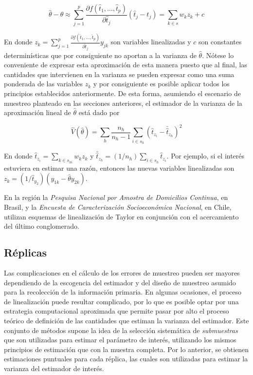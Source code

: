 \documentclass[12pt,spanish,]{book}
\begin{document}
\[
\hat{\theta} - \theta 
\approx \sum_{j=1}^p \frac{\partial f(\hat{t}_1, \ldots, \hat{t}_p) }{\partial \hat{t}_j}(\hat{t}_j - t_j)
= \sum_{k\in s} w_k z_k + c
\]

En donde \(z_k= \sum_{j=1}^p \frac{\partial f(\hat{t}_1, \ldots, \hat{t}_p) }{\partial \hat{t}_j} y_{jk}\) son variables linealizadas y \(c\) son constantes determinísticas que por consiguiente no aportan a la varianza de \(\hat{\theta}\). Nótese lo conveniente de expresar esta aproximación de esta manera puesto que al final, las cantidades que intervienen en la varianza se pueden expresar como una suma ponderada de las variables \(z_k\) y por consiguiente es posible aplicar todos los principios establecidos anteriormente. De esta forma, asumiendo el escenario de muestreo planteado en las secciones anteriores, el estimador de la varianza de la aproximación lineal de \(\hat{\theta}\) está dado por

\[
\hat{V}(\hat{\theta}) = 
\sum_h\frac{n_h}{n_h-1}\sum_{i\in s_h}\left(\hat{t}_{z_i}-\bar{\hat{t}}_{z_h}\right)^2
\]

En donde \(\hat{t}_{z_i} = \sum_{k \in s_{hi}} w_k z_k\) y \(\bar{\hat{t}}_{z_h}=(1/n_h)\sum_{i \in s_h}\hat{t}_{z_i}\). Por ejemplo, si el interés estuviera en estimar una razón, entonces las nuevas variables linealizadas son \(z_k=(1/\hat{t}_{y_2})(y_{1k}-\hat{\theta}y_{2k})\).

En la región la \emph{Pesquisa Nacional por Amostra de Domicilios Continua}, en Brasil, y la \emph{Encuesta de Caracterización Socioeconómica Nacional}, en Chile, utilizan esquemas de linealización de Taylor en conjunción con el acercamiento del último conglomerado.

\hypertarget{replicas}{%
\subsection{Réplicas}\label{replicas}}

Las complicaciones en el cálculo de los errores de muestreo pueden ser mayores dependiendo de la escogencia del estimador y del diseño de muestreo asumido para la recolección de la información primaria. En algunas ocasiones, el proceso de linealización puede resultar complicado, por lo que es posible optar por una estrategia computacional aproximada que permite pasar por alto el proceso teórico de definición de las cantidades que estiman la varianza del estimador. Este conjunto de métodos supone la idea de la selección sistemática de \emph{submuestras} que son utilizadas para estimar el parámetro de interés, utilizando los mismos principios de estimación que con la muestra completa. Por lo anterior, se obtienen estimaciones puntuales para cada réplica, las cuales son utilizadas para estimar la varianza del estimador de interés.
\end{document}
